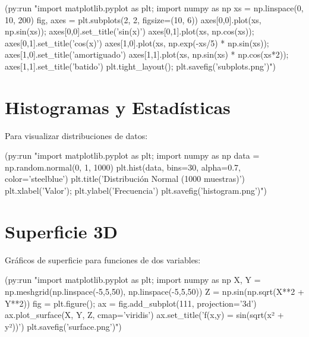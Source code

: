 \begin{lispcode}
(py:run "import matplotlib.pyplot as plt; import numpy as np
xs = np.linspace(0, 10, 200)
fig, axes = plt.subplots(2, 2, figsize=(10, 6))
axes[0,0].plot(xs, np.sin(xs)); axes[0,0].set_title('sin(x)')
axes[0,1].plot(xs, np.cos(xs)); axes[0,1].set_title('cos(x)')
axes[1,0].plot(xs, np.exp(-xs/5) * np.sin(xs)); axes[1,0].set_title('amortiguado')
axes[1,1].plot(xs, np.sin(xs) * np.cos(xs*2)); axes[1,1].set_title('batido')
plt.tight_layout(); plt.savefig('subplots.png')")
\end{lispcode}

\section{Histogramas y Estadísticas}

Para visualizar distribuciones de datos:

\begin{lispcode}
(py:run "import matplotlib.pyplot as plt; import numpy as np
data = np.random.normal(0, 1, 1000)
plt.hist(data, bins=30, alpha=0.7, color='steelblue')
plt.title('Distribución Normal (1000 muestras)')
plt.xlabel('Valor'); plt.ylabel('Frecuencia')
plt.savefig('histogram.png')")
\end{lispcode}

\begin{center}
\end{center}

\section{Superficie 3D}

Gráficos de superficie para funciones de dos variables:

\begin{lispcode}
(py:run "import matplotlib.pyplot as plt; import numpy as np
X, Y = np.meshgrid(np.linspace(-5,5,50), np.linspace(-5,5,50))
Z = np.sin(np.sqrt(X**2 + Y**2))
fig = plt.figure(); ax = fig.add_subplot(111, projection='3d')
ax.plot_surface(X, Y, Z, cmap='viridis')
ax.set_title('f(x,y) = sin(sqrt(x² + y²))')
plt.savefig('surface.png')")
\end{lispcode}

